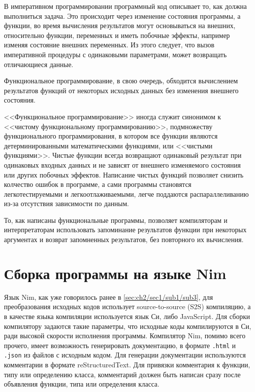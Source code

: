 В императивном программировании программный код
описывает то, как должна выполниться задача. Это
происходит через изменение состояния программы, а
функции, во время вычисления результатов могут основываться
на внешних, относительно функции, переменных и иметь
побочные эффекты, например изменяя состояние внешних
переменных. Из этого следует, что вызов
императивной процедуры с одинаковыми параметрами,
может возвращать отличающиеся данные.

Функциональное программирование, в свою очередь, обходится
вычислением результатов функций от некоторых исходных данных
без изменения внешнего состояния.

<<Функциональное программирование>> иногда служит синонимом к 
<<чистому функциональному программированию>>, подмножеству
функционального программирования, в котором все функции являются
детерминированными математическими функциями, или <<чистыми функциями>>.
Чистые функции всегда возвращают одинаковый результат при одинаковых
входных данных и не зависят от внешнего изменяемого состояния или других
побочных эффектов.
Написание чистых функций позволяет снизить колчество ошибок в программе,
а сами программы становятся легкотестируемыми и легкоотлаживаемыми, легче
поддаются распараллеливанию из-за отсутствия зависимости по данным.

То, как написаны функциональные программы, позволяет компиляторам и
интерпретаторам использовать запоминание результатов функции при некоторых
аргументах и возврат запомненных результатов, без повторного их вычисления.

\section{Сборка программы на языке Nim}\label{sec:ch3/sec1/sub1}
Язык Nim, как уже говорилось ранее в \autoref{sec:ch2/sec1/sub1/sub3}, для преобразования
исходных кодов использует source-to-source (S2S) компиляцию, а в качестве языка компиляции
используется язык Си, либо JavaScript. Для сборки {\ProgModule} компилятору задаются 
такие параметры, что исходные коды компилируются в Си, ради высокой скорости исполнения
программы.
Компилятор Nim, помимо всего прочего, имеет возможность генерировать документацию, в формате
\verb|.html| и \verb|.json| из файлов с исходным кодом.
Для генерации документации используются комментарии в формате reStructuredText.
Для привязки комментария к функции, типу или определению класса,
комментарий должен быть написан сразу после объявления функции,
типа или определения класса.

